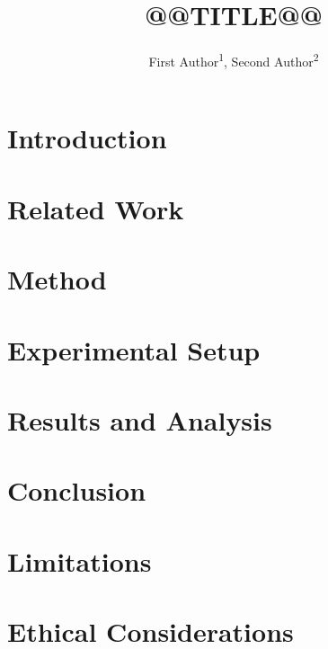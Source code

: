 \documentclass[letterpaper]{article}       %
\title{@@TITLE@@}
\author{First Author\textsuperscript{1}, Second Author\textsuperscript{2}}
\begin{document}
\maketitle

\begin{abstract}

\end{abstract}


\section{Introduction}\label{sec:intro}


\section{Related Work}\label{sec:related}


\section{Method}\label{sec:method}


\section{Experimental Setup}\label{sec:setup}


\section{Results and Analysis}\label{sec:results}


\section{Conclusion}\label{sec:conclusion}


\section{Limitations}


\section{Ethical Considerations}

\end{document}
